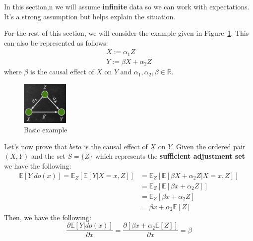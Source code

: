 \begin{note}
    In this section,n we will assume \textbf{infinite} data so we can work with expectations.
    It's a strong assumption but helps explain the situation.
\end{note}

For the rest of this section, we will consider the example given in Figure~\ref{fig:example}.
This can also be represented as follows:
\begin{equation}
    \begin{array}{l}
        X := \alpha_1 Z \\ Y := \beta X + \alpha_2 Z
    \end{array}
\end{equation}
where $\beta$ is the causal effect of $X$ on $Y$ and $\alpha_1, \alpha_2, \beta \in \mathbb{R}$.
\begin{figure}[!ht]
    \centering
    \includegraphics[width=0.2\textwidth]{img/structural_causal_model/example.png}
    \caption{Basic example}
    \label{fig:example}
\end{figure}

Let's now prove that $ beta$ is the causal effect of $X$ on $Y$. Given the ordered
pair $(X, Y)$ and the set $S = \{Z\}$ which represents the \textbf{sufficient
    adjustment set} we have the following:
\begin{equation}
    \begin{array}{ll}
        \mathbb{E}[Y | do(x)] = \mathbb{E}_Z[\mathbb{E}[Y | X = x, Z]] & = \mathbb{E}_Z[\mathbb{E}[\beta X + \alpha_2 Z | X = x, Z]] \\
                                                                       & = \mathbb{E}_Z[\mathbb{E}[\beta x + \alpha_2 Z]]            \\
                                                                       & = \mathbb{E}_Z[\beta x + \alpha_2 Z]                        \\
                                                                       & = \beta x + \alpha_2\mathbb{E}[Z]
    \end{array}
\end{equation}
Then, we have the following:
\begin{equation}
    \frac{\partial \mathbb{E}[Y |do(x)]}{\partial x} = \frac{\partial [\beta x + \alpha_2\mathbb{E}[Z]]}{\partial x} = \beta
\end{equation}

